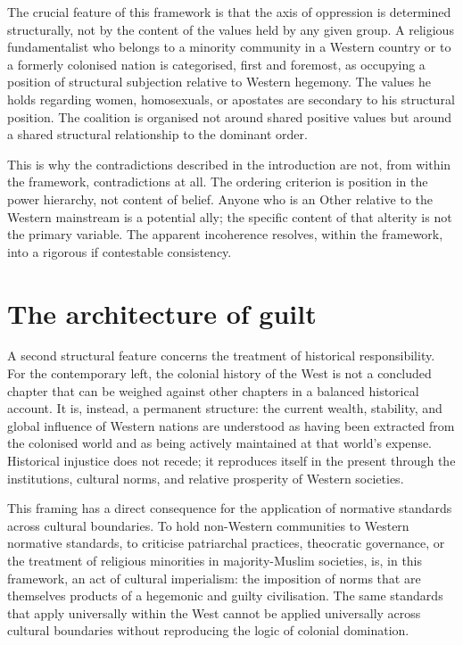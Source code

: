 \documentclass[12pt,a4paper]{article}
\begin{document}
	The crucial feature of this framework is that the axis of oppression is determined
	structurally, not by the content of the values held by any given group. A religious
	fundamentalist who belongs to a minority community in a Western country or to a
	formerly colonised nation is categorised, first and foremost, as occupying a
	position of structural subjection relative to Western hegemony. The values he holds
	regarding women, homosexuals, or apostates are secondary to his structural position.
	The coalition is organised not around shared positive values but around a shared
	structural relationship to the dominant order.
	
	This is why the contradictions described in the introduction are not, from within
	the framework, contradictions at all. The ordering criterion is position in the
	power hierarchy, not content of belief. Anyone who is an Other relative to the
	Western mainstream is a potential ally; the specific content of that alterity is
	not the primary variable. The apparent incoherence resolves, within the framework,
	into a rigorous if contestable consistency.
	
	\section{The architecture of guilt}
	
	A second structural feature concerns the treatment of historical responsibility.
	For the contemporary left, the colonial history of the West is not a concluded
	chapter that can be weighed against other chapters in a balanced historical account.
	It is, instead, a permanent structure: the current wealth, stability, and global
	influence of Western nations are understood as having been extracted from the
	colonised world and as being actively maintained at that world's expense. Historical
	injustice does not recede; it reproduces itself in the present through the
	institutions, cultural norms, and relative prosperity of Western societies.
	
	This framing has a direct consequence for the application of normative standards
	across cultural boundaries. To hold non-Western communities to Western normative
	standards, to criticise patriarchal practices, theocratic governance, or the
	treatment of religious minorities in majority-Muslim societies, is, in this
	framework, an act of cultural imperialism: the imposition of norms that are
	themselves products of a hegemonic and guilty civilisation. The same standards
	that apply universally within the West cannot be applied universally across cultural
	boundaries without reproducing the logic of colonial domination.
	
\end{document}
